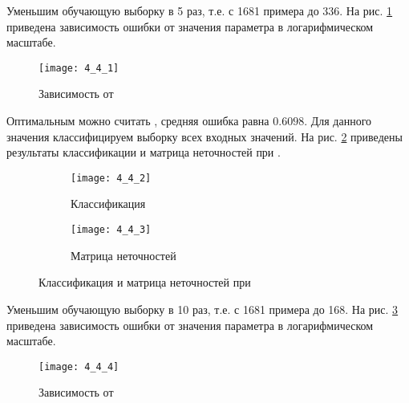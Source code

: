 
Уменьшим обучающую выборку в 5 раз, т.е. с 1681 примера до 336. На рис. \ref{fig:4_4_1} приведена зависимость ошибки  от значения параметра  в логарифмическом масштабе. 
\begin{figure}[H]
\begin{center}
	\texttt{[image: 4\_4\_1]}
	\caption{Зависимость  от }
	\label{fig:4_4_1}
\end{center}
\end{figure}

Оптимальным можно считать , средняя ошибка равна $0.6098$. Для данного значения классифицируем выборку всех входных значений. На рис. \ref{fig:4_4_2} приведены результаты классификации и матрица неточностей при .
\begin{figure}[H]
\begin{center}
	\begin{subfigure}{0.49\textwidth}
		\texttt{[image: 4\_4\_2]}
		\caption{Классификация}
	\end{subfigure}
	\begin{subfigure}{0.49\textwidth}
		\texttt{[image: 4\_4\_3]}
		\caption{Матрица неточностей}
	\end{subfigure}
	\caption{Классификация и матрица неточностей при }
	\label{fig:4_4_2}
\end{center}
\end{figure}

\newpage

Уменьшим обучающую выборку в 10 раз, т.е. с 1681 примера до 168. На рис. \ref{fig:4_4_4} приведена зависимость ошибки  от значения параметра  в логарифмическом масштабе. 
\begin{figure}[H]
\begin{center}
	\texttt{[image: 4\_4\_4]}
	\caption{Зависимость  от }
	\label{fig:4_4_4}
\end{center}
\end{figure}
\vspace{-1cm}

